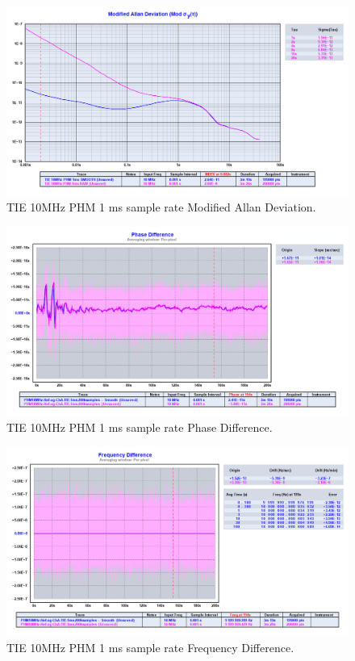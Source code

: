\documentclass[11pt,english,a4paper]{article}
\begin{document}
\begin{figure}[!htb]
  \centering
    \includegraphics[width=1\textwidth]{tie_10mhz_phm_1ms_modified_allan.png}
    \caption{TIE 10MHz PHM 1 ms sample rate Modified Allan Deviation.}
        \label{fig:PHM_10MHz_mod_allan_dev}
\end{figure}

\begin{figure}[!htb]
  \centering
    \includegraphics[width=1\textwidth]{part4_phase_diff.png}
    \caption{TIE 10MHz PHM 1 ms sample rate Phase Difference.}
        \label{fig:PHM_10MHz_phase_diff}
\end{figure}

\begin{figure}[!htb]
  \centering
    \includegraphics[width=1\textwidth]{part4_freq_diff.png}
    \caption{TIE 10MHz PHM 1 ms sample rate Frequency Difference.}
        \label{fig:PHM_10MHz_frequency_diff}
\end{figure}
\end{document}
